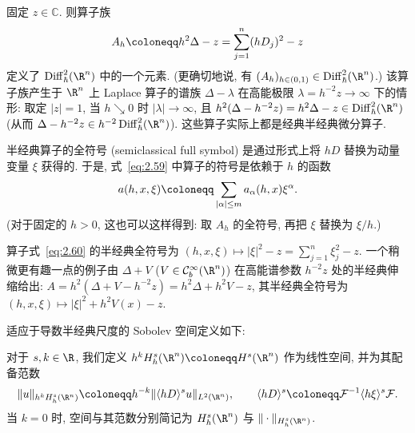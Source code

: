 \begin{example}[高能极限下的谱族]\label{eg:2.24}
固定 $z \in \mathbb{C}$. 则算子族
\begin{equation}\label{eq:2.60}
    A_h \defeq h^2 \Delta - z = \sum_{j=1}^n (h D_j)^2 - z
\end{equation}
定义了 $\Diff_\hbar^2(\R^n)$ 中的一个元素. (更确切地说, 有 $(A_h)_{h \in (0, 1)} \in \Diff_\hbar^2(\R^n)$.) 该算子族产生于 $\R^n$ 上 Laplace 算子的谱族 $\Delta - \lambda$ 在高能极限 $\lambda = h^{-2} z \to \infty$ 下的情形: 取定 $|z| = 1$, 当 $h \searrow 0$ 时 $|\lambda| \to \infty$, 且 $h^2(\Delta - h^{-2} z) = h^2 \Delta - z \in \Diff_\hbar^2(\R^n)$ (从而 $\Delta - h^{-2} z \in h^{-2} \Diff_\hbar^2(\R^n)$). 这些算子实际上都是经典半经典微分算子.
\end{example}

半经典算子的全符号 (semiclassical full symbol) 是通过形式上将 $h D$ 替换为动量变量 $\xi$ 获得的. 于是, 式~\eqref{eq:2.59} 中算子的符号是依赖于 $h$ 的函数
\begin{equation}\label{eq:2.61}
    a(h, x, \xi) \defeq \sum_{|\alpha| \le m} a_\alpha(h, x) \xi^\alpha.
\end{equation}
(对于固定的 $h > 0$, 这也可以这样得到: 取 $A_h$ 的全符号, 再把 $\xi$ 替换为 $\xi/h$.)

\begin{example}[半经典全符号]\label{eg:2.25}
算子式~\eqref{eq:2.60} 的半经典全符号为 $(h, x, \xi) \mapsto |\xi|^2 - z = \sum_{j=1}^n \xi_j^2 - z$. 一个稍微更有趣一点的例子由 $\Delta + V$ ($V \in \mathcal{C}_b^\infty(\R^n)$) 在高能谱参数 $h^{-2} z$ 处的半经典伸缩给出: $A = h^2(\Delta + V - h^{-2} z) = h^2 \Delta + h^2 V - z$, 其半经典全符号为 $(h, x, \xi) \mapsto |\xi|^2 + h^2 V(x) - z$.
\end{example}

适应于导数半经典尺度的 Sobolev 空间定义如下:

\begin{definition}\label{def:2.26}
对于 $s, k \in \R$, 我们定义 $h^k H_h^s(\R^n) \defeq H^s(\R^n)$ 作为线性空间, 并为其配备范数
\begin{equation}\label{eq:2.62}
    \|u\|_{h^k H_h^s(\R^n)} \defeq h^{-k} \|\langle h D \rangle^s u\|_{L^2(\R^n)}, \qquad \langle h D \rangle^s \defeq \mathcal{F}^{-1} \langle h \xi \rangle^s \mathcal{F}.
\end{equation}
当 $k = 0$ 时, 空间与其范数分别简记为 $H_h^s(\R^n)$ 与 $\|\cdot\|_{H_h^s(\R^n)}$.
\end{definition}

